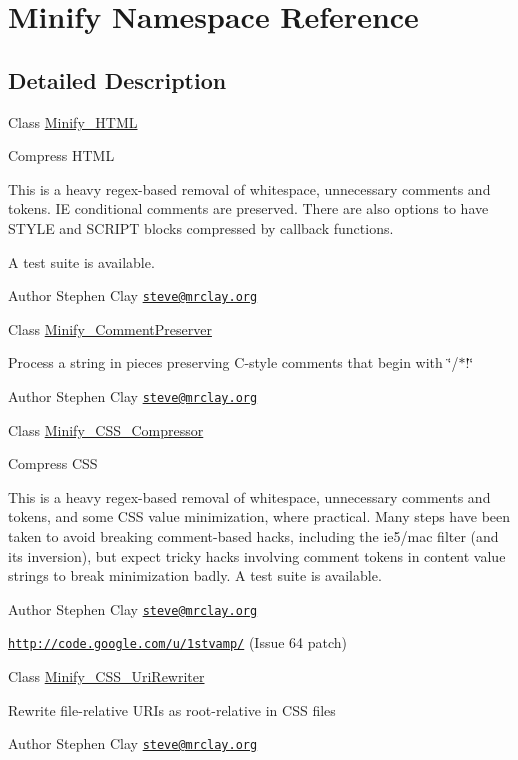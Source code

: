 \hypertarget{namespace_minify}{}\section{Minify Namespace Reference}
\label{namespace_minify}


\subsection{Detailed Description}
Class \hyperlink{class_minify___h_t_m_l}{Minify\+\_\+\+H\+T\+ML}

Compress H\+T\+ML

This is a heavy regex-\/based removal of whitespace, unnecessary comments and tokens. IE conditional comments are preserved. There are also options to have S\+T\+Y\+LE and S\+C\+R\+I\+PT blocks compressed by callback functions.

A test suite is available.

\begin{DoxyAuthor}{Author}
Stephen Clay \href{mailto:steve@mrclay.org}{\tt steve@mrclay.\+org}
\end{DoxyAuthor}
Class \hyperlink{class_minify___comment_preserver}{Minify\+\_\+\+Comment\+Preserver}

Process a string in pieces preserving C-\/style comments that begin with \char`\"{}/$\ast$!\char`\"{}

\begin{DoxyAuthor}{Author}
Stephen Clay \href{mailto:steve@mrclay.org}{\tt steve@mrclay.\+org}
\end{DoxyAuthor}
Class \hyperlink{class_minify___c_s_s___compressor}{Minify\+\_\+\+C\+S\+S\+\_\+\+Compressor}

Compress C\+SS

This is a heavy regex-\/based removal of whitespace, unnecessary comments and tokens, and some C\+SS value minimization, where practical. Many steps have been taken to avoid breaking comment-\/based hacks, including the ie5/mac filter (and its inversion), but expect tricky hacks involving comment tokens in \textquotesingle{}content\textquotesingle{} value strings to break minimization badly. A test suite is available.

\begin{DoxyAuthor}{Author}
Stephen Clay \href{mailto:steve@mrclay.org}{\tt steve@mrclay.\+org} 

\href{http://code.google.com/u/1stvamp/}{\tt http\+://code.\+google.\+com/u/1stvamp/} (Issue 64 patch)
\end{DoxyAuthor}
Class \hyperlink{class_minify___c_s_s___uri_rewriter}{Minify\+\_\+\+C\+S\+S\+\_\+\+Uri\+Rewriter}

Rewrite file-\/relative U\+R\+Is as root-\/relative in C\+SS files

\begin{DoxyAuthor}{Author}
Stephen Clay \href{mailto:steve@mrclay.org}{\tt steve@mrclay.\+org} 
\end{DoxyAuthor}
